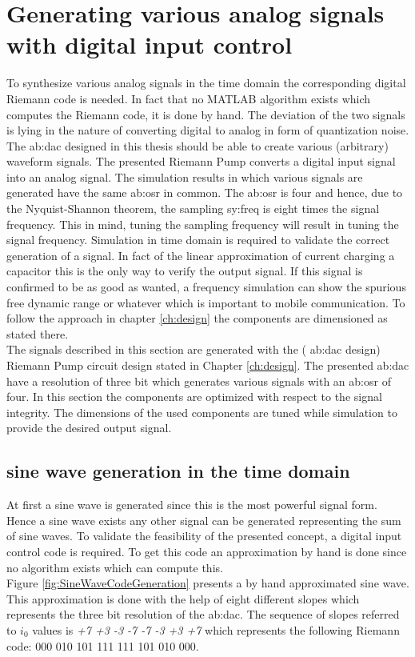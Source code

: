 \section{Generating various analog signals with digital input control}
To synthesize various analog signals in the time domain the corresponding digital Riemann code is needed. 
In fact that no MATLAB algorithm exists which computes the Riemann code, it is done by hand. 
 The deviation of the two signals is lying in the nature of converting digital to analog in form of quantization noise.
The \gls{ab:dac} designed in this thesis should be able to create various (arbitrary) waveform signals.
The presented Riemann Pump converts a digital input signal into an analog signal.
The simulation results in which various signals are generated have the same \gls{ab:osr} in common.
The \gls{ab:osr} is four and hence, due to the Nyquist-Shannon theorem, the sampling \gls{sy:freq} is eight times the signal frequency.
This in mind, tuning the sampling frequency will result in tuning the signal frequency.
Simulation in time domain is required to validate the correct generation of a signal. In fact of the linear approximation of current charging a capacitor this is the only way to verify the output signal. If this signal is confirmed to be as good as wanted, a frequency simulation can show the spurious free dynamic range or whatever which is important to mobile communication. To follow the approach in chapter \ref{ch:design} the components are dimensioned as stated there.\\
 The signals described in this section are generated with the ( \gls{ab:dac} design) Riemann Pump circuit design stated in Chapter \ref{ch:design}. The presented \gls{ab:dac} have a resolution of three bit which generates various signals with an \gls{ab:osr} of four. 
 In this section the components are optimized with respect to the signal integrity. The dimensions of the used components are tuned while simulation to provide the desired output signal.
 
\subsection{sine wave generation in the time domain}
At first a sine wave is generated since this is the most powerful signal form.
Hence a sine wave exists any other signal can be generated representing the sum of sine waves.
To validate the feasibility of the presented concept, a digital input control code is required.
To get this code an approximation by hand is done since no algorithm exists which can compute this.\\
Figure \ref{fig:SineWaveCodeGeneration} presents a by hand approximated sine wave.
This approximation is done with the help of eight different slopes which represents the three bit resolution of the \gls{ab:dac}. The sequence of slopes referred to $i_0$ values is \textit{+7 +3 -3 -7 -7 -3 +3 +7} which represents the following Riemann code:  000 010 101 111 111 101 010 000.
 

